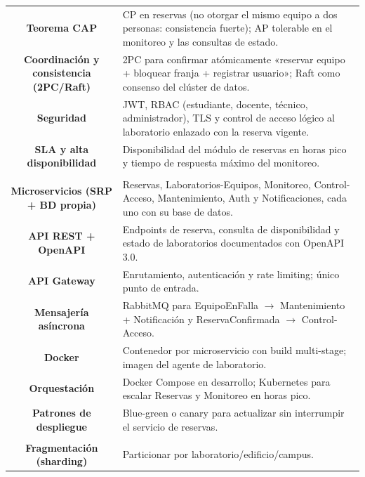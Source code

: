 \documentclass[11pt]{article}
\begin{document}
\begin{longtable}{C A}
\textbf{Teorema CAP} & CP en reservas (no otorgar el mismo equipo a dos personas: consistencia fuerte); AP tolerable en el monitoreo y las consultas de estado.\\
\textbf{Coordinación y consistencia (2PC/Raft)} & 2PC para confirmar atómicamente «reservar equipo + bloquear franja + registrar usuario»; Raft como consenso del clúster de datos.\\
\textbf{Seguridad} & JWT, RBAC (estudiante, docente, técnico, administrador), TLS y control de acceso lógico al laboratorio enlazado con la reserva vigente.\\
\textbf{SLA y alta disponibilidad} & Disponibilidad del módulo de reservas en horas pico y tiempo de respuesta máximo del monitoreo.\\
\addlinespace[1pt]
\\
\textbf{Microservicios (SRP + BD propia)} & Reservas, Laboratorios-Equipos, Monitoreo, Control-Acceso, Mantenimiento, Auth y Notificaciones, cada uno con su base de datos.\\
\textbf{API REST + OpenAPI} & Endpoints de reserva, consulta de disponibilidad y estado de laboratorios documentados con OpenAPI 3.0.\\
\textbf{API Gateway} & Enrutamiento, autenticación y rate limiting; único punto de entrada.\\
\textbf{Mensajería asíncrona} & RabbitMQ para EquipoEnFalla $\rightarrow$ Mantenimiento + Notificación y ReservaConfirmada $\rightarrow$ Control-Acceso.\\
\textbf{Docker} & Contenedor por microservicio con build multi-stage; imagen del agente de laboratorio.\\
\textbf{Orquestación} & Docker Compose en desarrollo; Kubernetes para escalar Reservas y Monitoreo en horas pico.\\
\textbf{Patrones de despliegue} & Blue-green o canary para actualizar sin interrumpir el servicio de reservas.\\
\addlinespace[1pt]
\\
\textbf{Fragmentación (sharding)} & Particionar por laboratorio/edificio/campus.\\

\end{longtable}
\end{document}
